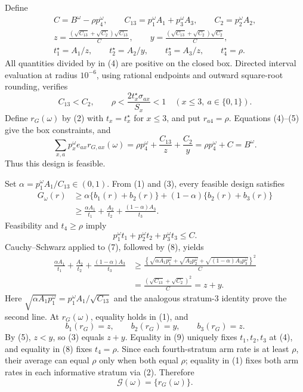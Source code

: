 Define
\[
 \begin{gathered}
 C=B^\omega-\rho p_4^\omega,\qquad
 C_{13}=p_1^\omega A_1+p_3^\omega A_3,\qquad C_2=p_2^\omega A_2,\\
 z=\frac{(\sqrt{C_{13}}+\sqrt{C_2})\sqrt{C_{13}}}{C},\qquad
 y=\frac{(\sqrt{C_{13}}+\sqrt{C_2})\sqrt{C_2}}{C},\\
 t_1^\star=A_1/z,\qquad t_2^\star=A_2/y,\qquad t_3^\star=A_3/z,\qquad
 t_4^\star=\rho.                                                     \tag{4}
 \end{gathered}
\]
All quantities divided by in (4) are positive on the closed box.  Directed interval evaluation at radius \(10^{-6}\), using rational endpoints and outward square-root rounding, verifies
\[
 C_{13}<C_2,\qquad
 \rho<\frac{2t_x^\star\sigma_{ax}}{S_x}<1
 \quad(x\leq3,\ a\in\{0,1\}).                                     \tag{5}
\]
Define \(r_G(\omega)\) by (2) with \(t_x=t_x^\star\) for \(x\leq3\), and put \(r_{a4}=\rho\).  Equations (4)--(5) give the box constraints, and
\[
 \sum_{x,a}p_x^\omega e_{ax}r_{G,ax}(\omega)
 =\rho p_4^\omega+\frac{C_{13}}z+\frac{C_2}y
 =\rho p_4^\omega+C=B^\omega.                                     \tag{6}
\]
Thus this design is feasible.

Set \(\alpha=p_1^\omega A_1/C_{13}\in(0,1)\).  From (1) and (3), every feasible design satisfies
\[
 \begin{aligned}
 G_\omega(r)
 &\geq\alpha\{b_1(r)+b_2(r)\}+(1-\alpha)\{b_2(r)+b_3(r)\}\\
 &\geq\frac{\alpha A_1}{t_1}+\frac{A_2}{t_2}
       +\frac{(1-\alpha)A_3}{t_3}.                                  \tag{7}
 \end{aligned}
\]
Feasibility and \(t_4\geq\rho\) imply
\[
 p_1^\omega t_1+p_2^\omega t_2+p_3^\omega t_3\leq C.               \tag{8}
\]
Cauchy--Schwarz applied to (7), followed by (8), yields
\[
 \begin{aligned}
 \frac{\alpha A_1}{t_1}+\frac{A_2}{t_2}+
 \frac{(1-\alpha)A_3}{t_3}
 &\geq\frac{\left\{\sqrt{\alpha A_1p_1^\omega}+
 \sqrt{A_2p_2^\omega}+\sqrt{(1-\alpha)A_3p_3^\omega}\right\}^2}{C}\\
 &=\frac{(\sqrt{C_{13}}+\sqrt{C_2})^2}{C}=z+y.                     \tag{9}
 \end{aligned}
\]
Here \(\sqrt{\alpha A_1p_1^\omega}=p_1^\omega A_1/\sqrt{C_{13}}\) and the analogous stratum-\(3\) identity prove the second line.  At \(r_G(\omega)\), equality holds in (1), and
\[
 b_1(r_G)=z,\qquad b_2(r_G)=y,\qquad b_3(r_G)=z.
\]
By (5), \(z<y\), so (3) equals \(z+y\).  Equality in (9) uniquely fixes \(t_1,t_2,t_3\) at (4), and equality in (8) fixes \(t_4=\rho\).  Since each fourth-stratum arm rate is at least \(\rho\), their average can equal \(\rho\) only when both equal \(\rho\); equality in (1) fixes both arm rates in each informative stratum via (2).  Therefore
\[
 \mathcal G(\omega)=\{r_G(\omega)\}.                               \tag{10}
\]

